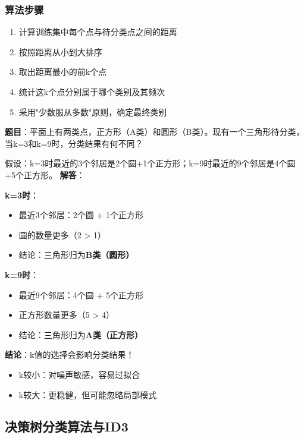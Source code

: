 \subsubsection{算法步骤}

\begin{enumerate}[leftmargin=2em,itemsep=0pt]
    \item 计算训练集中每个点与待分类点之间的距离
    \item 按照距离从小到大排序
    \item 取出距离最小的前k个点
    \item 统计这k个点分别属于哪个类别及其频次
    \item 采用"少数服从多数"原则，确定最终类别
\end{enumerate}

\begin{examplebox}[例题5.1 KNN分类]
\textbf{题目}：平面上有两类点，正方形（A类）和圆形（B类）。现有一个三角形待分类，当k=3和k=9时，分类结果有何不同？

假设：k=3时最近的3个邻居是2个圆+1个正方形；k=9时最近的9个邻居是4个圆+5个正方形。
\tcblower
\textbf{解答}：

\textbf{k=3时}：
\begin{itemize}[itemsep=0pt]
    \item 最近3个邻居：2个圆 + 1个正方形
    \item 圆的数量更多（2 > 1）
    \item 结论：三角形归为\textbf{B类（圆形）}
\end{itemize}

\textbf{k=9时}：
\begin{itemize}[itemsep=0pt]
    \item 最近9个邻居：4个圆 + 5个正方形
    \item 正方形数量更多（5 > 4）
    \item 结论：三角形归为\textbf{A类（正方形）}
\end{itemize}

\textbf{结论}：k值的选择会影响分类结果！
\begin{itemize}[itemsep=0pt]
    \item k较小：对噪声敏感，容易过拟合
    \item k较大：更稳健，但可能忽略局部模式
\end{itemize}
\end{examplebox}

\subsection{决策树分类算法与ID3}

